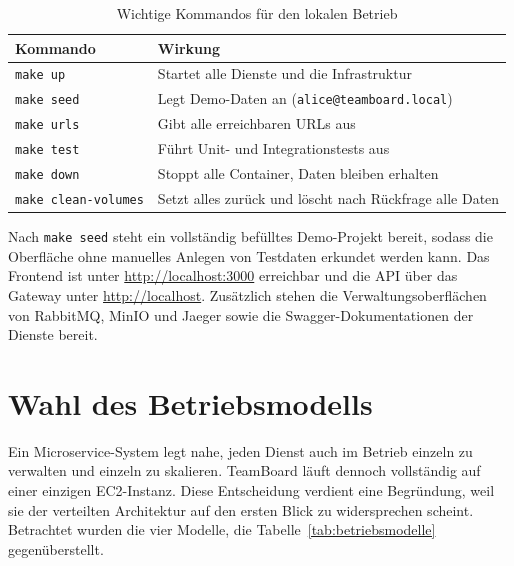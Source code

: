 \begin{table}[ht]
  \centering
  \caption{Wichtige Kommandos für den lokalen Betrieb}
  \label{tab:make-kommandos}
  \begin{tabularx}{\linewidth}{@{}lX@{}}
    \toprule
    \textbf{Kommando} & \textbf{Wirkung} \\
    \midrule
    \texttt{make up}            & Startet alle Dienste und die Infrastruktur \\
    \texttt{make seed}          & Legt Demo-Daten an (\texttt{alice@teamboard.local}) \\
    \texttt{make urls}          & Gibt alle erreichbaren URLs aus \\
    \texttt{make test}          & Führt Unit- und Integrationstests aus \\
    \texttt{make down}          & Stoppt alle Container, Daten bleiben erhalten \\
    \texttt{make clean-volumes} & Setzt alles zurück und löscht nach Rückfrage alle Daten \\
    \bottomrule
  \end{tabularx}
\end{table}

Nach \texttt{make seed} steht ein vollständig befülltes Demo-Projekt bereit, sodass die Oberfläche ohne manuelles Anlegen von Testdaten erkundet werden kann. Das Frontend ist unter \url{http://localhost:3000} erreichbar und die API über das Gateway unter \url{http://localhost}. Zusätzlich stehen die Verwaltungsoberflächen von RabbitMQ, MinIO und Jaeger sowie die Swagger-Dokumentationen der Dienste bereit.

\section{Wahl des Betriebsmodells}
\label{sec:betriebsmodell}

Ein Microservice-System legt nahe, jeden Dienst auch im Betrieb einzeln zu verwalten und einzeln zu skalieren. TeamBoard läuft dennoch vollständig auf einer einzigen EC2-Instanz. Diese Entscheidung verdient eine Begründung, weil sie der verteilten Architektur auf den ersten Blick zu widersprechen scheint. Betrachtet wurden die vier Modelle, die Tabelle~\vref{tab:betriebsmodelle} gegenüberstellt.

